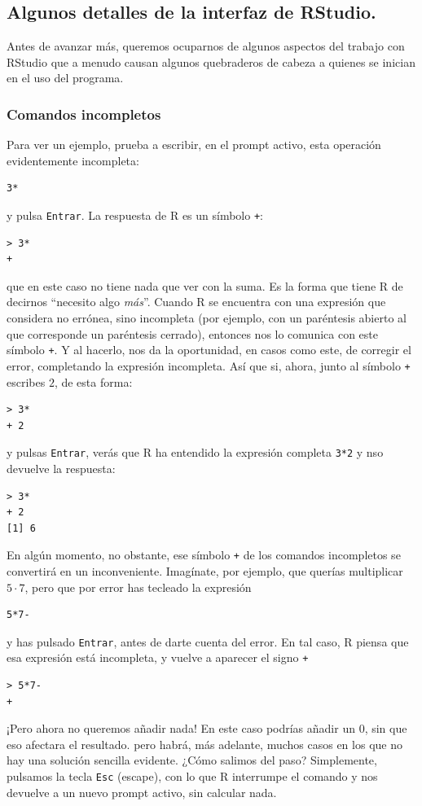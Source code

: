 \documentclass[10pt,a4paper]{article}\usepackage[]{graphicx}\usepackage[]{color}
\begin{document}
\subsection{Algunos detalles de la interfaz de RStudio.}
\label{tut02:subsec:AlgunosDetallesInterfazRStudio}

Antes de avanzar más, queremos ocuparnos de algunos aspectos del trabajo con RStudio que a menudo causan algunos quebraderos de cabeza a quienes se inician en el uso del programa.

\subsubsection*{Comandos incompletos}

Para ver un ejemplo, prueba a escribir, en el prompt activo, esta operación evidentemente incompleta:
\begin{verbatim}
3*
\end{verbatim}
y pulsa {\tt Entrar}. La respuesta de R es un símbolo {\tt +}:
\begin{verbatim}
> 3*
+
\end{verbatim}
que en este caso no tiene nada que ver con la suma. Es la forma que tiene R de decirnos ``necesito algo {\em más}''. Cuando R se encuentra con una expresión que considera no errónea, sino incompleta (por ejemplo, con un paréntesis abierto al que corresponde un paréntesis cerrado), entonces nos lo comunica con este símbolo {\tt +}. Y al hacerlo, nos da la oportunidad, en casos como este, de corregir el error, completando la expresión incompleta. Así que si, ahora, junto al símbolo {\tt +} escribes $2$, de esta forma:
\begin{verbatim}
> 3*
+ 2
\end{verbatim}
y pulsas {\tt Entrar}, verás que R ha entendido la expresión completa {\tt 3*2} y nso devuelve la respuesta:
\begin{verbatim}
> 3*
+ 2
[1] 6
\end{verbatim}
En algún momento, no obstante, ese símbolo {\tt +} de los comandos incompletos se convertirá en un inconveniente. Imagínate, por ejemplo, que querías multiplicar $5\cdot 7$, pero que por error has tecleado la expresión
\begin{verbatim}
5*7-
\end{verbatim}
y has pulsado {\tt Entrar}, antes de darte cuenta del error. En tal caso, R piensa que esa expresión está incompleta, y vuelve a aparecer el signo {\tt +}
\begin{verbatim}
> 5*7-
+
\end{verbatim}
¡Pero ahora no queremos añadir nada! En este caso podrías añadir un $0$, sin que eso afectara el resultado.  pero habrá, más adelante, muchos casos en los que no hay una solución sencilla evidente. ¿Cómo salimos del paso? Simplemente, pulsamos la tecla {\tt Esc} (escape), con lo que R interrumpe el comando y nos devuelve a un nuevo prompt activo, sin calcular nada.
\end{document}
